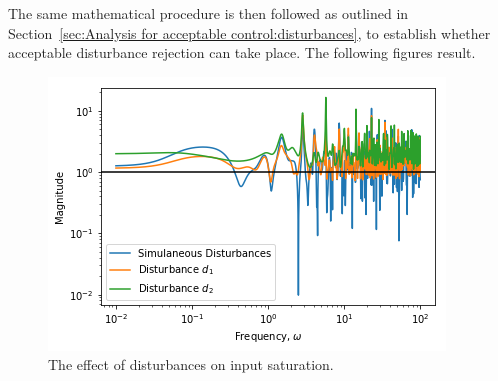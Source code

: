 The same mathematical procedure is then followed as outlined in Section~\ref{sec:Analysis for acceptable control:disturbances}, to establish whether acceptable disturbance rejection can take place. The following figures result.

\begin{figure}[H]
	\centering
	\includegraphics[width=0.7\linewidth]{"Figures/Disturbance Analysis 2 Max Norm_Updated"}
	\caption{The effect of disturbances on input saturation.}
	\label{fig:disturbance-analysis-2-max-norm_updated}
\end{figure}

